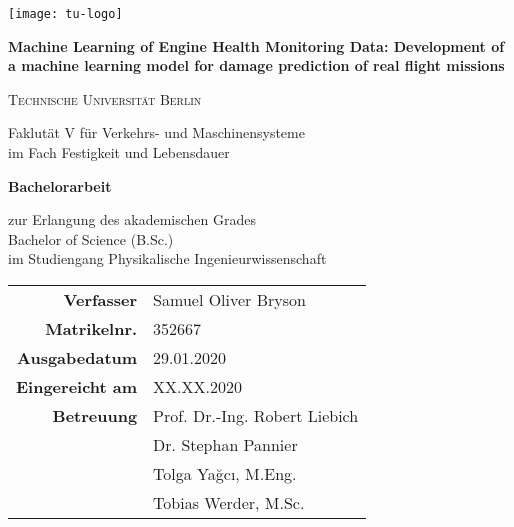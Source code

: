 
\begin{titlepage}

        \centering
        {\texttt{[image: tu-logo]}}

        \vspace{2.5cm}
        {\Large \textbf{Machine Learning of Engine Health Monitoring Data: Development of a machine learning model for damage prediction of real flight missions}\par}
        \vspace{1cm}
        {\scshape\Large Technische Universit\"at Berlin \par}
        \vspace{0.2cm}
        {\large Faklut\"at V f\"ur Verkehrs- und Maschinensysteme\\im Fach Festigkeit und Lebensdauer\par}
        \vspace{1.5cm}
        {\huge\bfseries Bachelorarbeit\par}
        \vspace{0.6cm}
        {\large zur Erlangung des akademischen Grades \\Bachelor of Science (B.Sc.)\\im Studiengang Physikalische Ingenieurwissenschaft\par}
        \vspace{1.2cm}
        \begin{tabular}{>{\bfseries}r l}
            Verfasser & Samuel Oliver Bryson \\
            Matrikelnr. & 352667 \\
            Ausgabedatum & 29.01.2020 \\
            Eingereicht am & XX.XX.2020 \\
            Betreuung & Prof. Dr.-Ing. Robert Liebich \\
            & Dr. Stephan Pannier \\
            & Tolga Ya\u{g}c\i{}, M.Eng.\\
            & Tobias Werder, M.Sc.\\
        \end{tabular}

\end{titlepage}